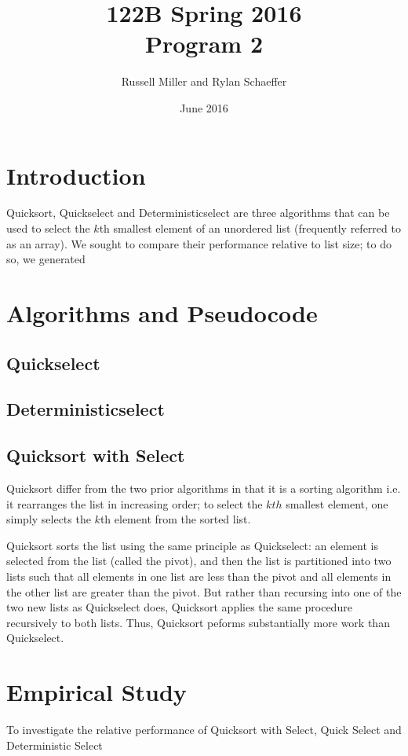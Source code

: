 \documentclass{article}
\title{122B Spring 2016 \\ Program 2}
\author{Russell Miller and Rylan Schaeffer }
\date{June 2016}
\begin{document}
\maketitle

\section*{Introduction}
Quicksort, Quickselect and Deterministicselect are three algorithms that can be used to select the $k$th smallest element of an unordered list (frequently referred to as an array). We sought to compare their performance relative to list size; to do so, we generated 

\section*{Algorithms and Pseudocode}
\subsection*{Quickselect}
\indent \indent 

\subsection*{Deterministicselect}
\indent \indent 

\subsection*{Quicksort with Select}
\indent \indent Quicksort differ from the two prior algorithms in that it is a sorting algorithm i.e. it rearranges the list in increasing order; to select the $kth$ smallest element, one simply selects the $k$th element from the sorted list.

Quicksort sorts the list using the same principle as Quickselect: an element is selected from the list (called the pivot), and then the list is partitioned into two lists such that all elements in one list are less than the pivot and all elements in the other list are greater than the pivot. But rather than recursing into one of the two new lists as Quickselect does, Quicksort applies the same procedure recursively to both lists. Thus, Quicksort peforms substantially more work than Quickselect.

\section*{Empirical Study}
To investigate the relative performance of Quicksort with Select, Quick Select and Deterministic Select
\end{document}

